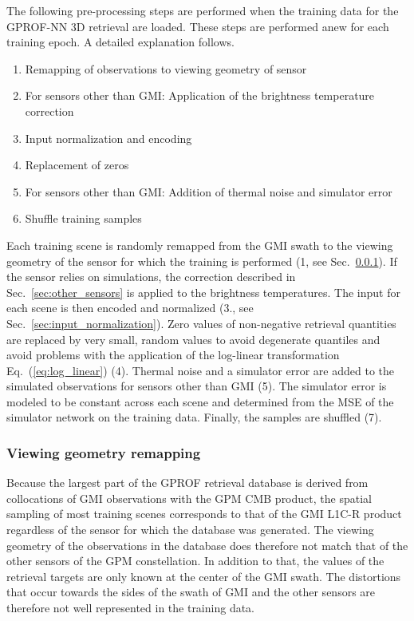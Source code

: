 \documentclass[journal abbreviation, manuscript]{copernicus}
\begin{document}
The following pre-processing steps are performed when the training data for the
GPROF-NN 3D retrieval are loaded. These steps are performed anew for each
training epoch. A detailed explanation follows.

\begin{enumerate}
\item Remapping of observations to viewing geometry of sensor
\item For sensors other than GMI: Application of the brightness temperature correction
\item Input normalization and encoding
\item Replacement of zeros
\item For sensors other than GMI: Addition of thermal noise and simulator error
\item Shuffle training samples
\end{enumerate}

Each training scene is randomly remapped from the GMI swath to the viewing
geometry of the sensor for which the training is performed (1, see
Sec.~\ref{sec:remapping}). If the sensor relies on simulations,
the correction described in Sec.~\ref{sec:other_sensors} is applied to
the brightness temperatures.
The
input for each scene is then encoded and normalized (3., see
Sec.~\ref{sec:input_normalization}). Zero values of non-negative retrieval
quantities are replaced by very small, random values to avoid degenerate
quantiles and avoid problems with the application of the log-linear
transformation Eq.~(\ref{eq:log_linear}) (4). Thermal noise and a
simulator error are added to the simulated observations for sensors other than
GMI (5). The simulator error is modeled to be constant across each scene
and determined from the MSE of the simulator network on the training data.
Finally, the samples are shuffled (7).



\subsubsection{Viewing geometry remapping}
\label{sec:remapping}

Because the largest part of the GPROF retrieval database is derived from
collocations of GMI observations with the GPM CMB product, the spatial sampling
of most training scenes corresponds to that of the GMI L1C-R product regardless
of the sensor for which the database was generated. The viewing geometry of the
observations in the database does therefore not match that of the other sensors
of the GPM constellation. In addition to that, the values of the retrieval
targets are only known at the center of the GMI swath. The distortions that
occur towards the sides of the swath of GMI and the other sensors are therefore
not well represented in the training data.
\end{document}
